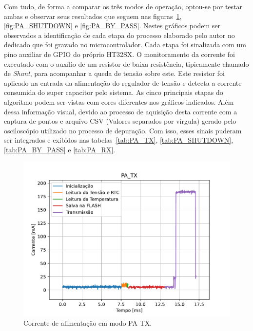 Com tudo, de forma a comparar os três modos de operação, optou-se por testar ambas e observar seus resultados que seguem nas figuras~\ref{fig:PA_TX}, \ref{fig:PA_SHUTDOWN} e \ref{fig:PA_BY_PASS}. Nestes gráficos podem ser observados a identificação de cada etapa do processo elaborado pelo autor no dedicado que foi gravado no microcontrolador. Cada etapa foi sinalizada com um pino auxiliar de GPIO do próprio HT32SX. O monitoramento da corrente foi executado com o auxílio de um resistor de baixa resistência, tipicamente chamado de \textit{Shunt}, para acompanhar a queda de tensão sobre este. Este resistor foi aplicado na entrada da alimentação do regulador de tensão e detecta a corrente consumida do super capacitor pelo sistema. As cinco principais etapas do algoritmo podem ser vistas com cores diferentes nos gráficos indicados. Além dessa informação visual, devido ao processo de aquisição desta corrente com a captura de pontos e arquivo CSV (Valores separados por vírgula) gerado pelo osciloscópio utilizado no processo de depuração. Com isso, esses sinais puderam ser integrados e exibidos nas tabelas~\ref{tab:PA_TX}, \ref{tab:PA_SHUTDOWN}, \ref{tab:PA_BY_PASS} e \ref{tab:PA_RX}.


\begin{figure}[h!]
  \caption{Corrente de alimentação em modo PA TX.}
  \begin{center}
      \includegraphics[scale=0.8]{scripts/PA_TX.pdf}
  \end{center}
  \label{fig:PA_TX}
\end{figure}

